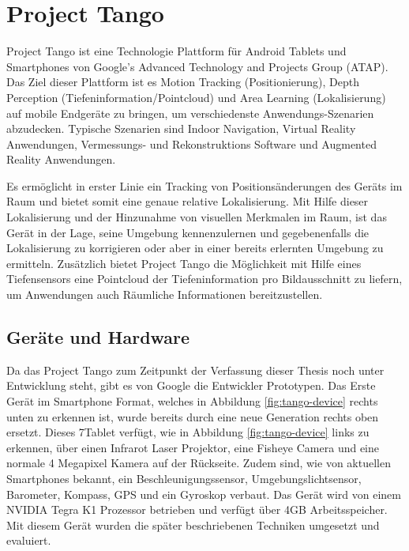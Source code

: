 
\section{Project Tango}

Project Tango ist eine Technologie Plattform für Android Tablets und Smartphones von Google’s Advanced Technology and Projects Group (ATAP). Das Ziel dieser Plattform ist es Motion Tracking (Positionierung), Depth Perception (Tiefeninformation/Pointcloud) und Area Learning (Lokalisierung) auf mobile Endgeräte zu bringen, um verschiedenste Anwendungs-Szenarien abzudecken. Typische Szenarien sind Indoor Navigation, Virtual Reality Anwendungen, Vermessungs- und Rekonstruktions Software und Augmented Reality Anwendungen.

Es ermöglicht in erster Linie ein Tracking von Positionsänderungen des Geräts im Raum und bietet somit eine genaue relative Lokalisierung. Mit Hilfe dieser Lokalisierung und der Hinzunahme von visuellen Merkmalen im Raum, ist das Gerät in der Lage, seine Umgebung kennenzulernen und gegebenenfalls die Lokalisierung zu korrigieren oder aber in einer bereits erlernten Umgebung zu ermitteln. Zusätzlich bietet Project Tango die Möglichkeit mit Hilfe eines Tiefensensors eine Pointcloud der Tiefeninformation pro Bildausschnitt zu liefern, um Anwendungen auch Räumliche Informationen bereitzustellen.  \citep{Proje19:online}

\subsection{Geräte und Hardware}

Da das Project Tango zum Zeitpunkt der Verfassung dieser Thesis noch unter Entwicklung steht, gibt es von Google die Entwickler Prototypen. Das Erste Gerät im Smartphone Format, welches in Abbildung \ref{fig:tango-device} rechts unten zu erkennen ist, wurde bereits durch eine neue Generation rechts oben ersetzt. Dieses 7\dq Tablet verfügt, wie in Abbildung \ref{fig:tango-device} links zu erkennen, über einen Infrarot Laser Projektor, eine Fisheye Camera und eine normale 4 Megapixel Kamera auf der Rückseite. Zudem sind, wie von aktuellen Smartphones bekannt, ein Beschleunigungssensor, Umgebungslichtsensor, Barometer, Kompass, GPS und ein Gyroskop verbaut. Das Gerät wird von einem NVIDIA Tegra K1 Prozessor betrieben und verfügt über 4GB Arbeitsspeicher. \citep{Proje19:online} Mit diesem Gerät wurden die später beschriebenen Techniken umgesetzt und evaluiert. 

